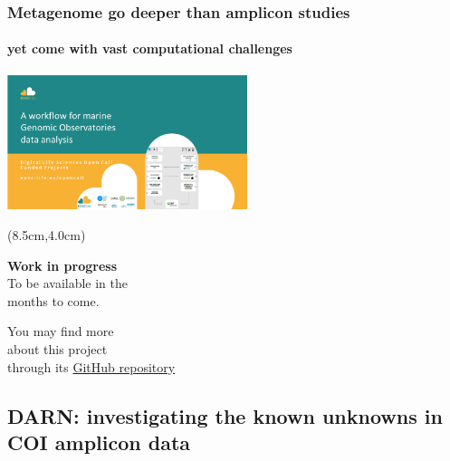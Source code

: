 \documentclass{beamer}
\begin{document}
   \begin{frame}
      \frametitle{Metagenome go deeper than amplicon studies}
      \framesubtitle{yet come with vast computational challenges}
      \includegraphics[width=70mm]{resources/marine-genomic-observatories.png}

      \begin{textblock*}{5cm}(8.5cm,4.0cm) %
            
         \textbf{Work in progress} \\
         To be available in the \\ months to come.

         \bigskip
         
         \footnotesize
         You may find more \\ 
         \footnotesize
         about this project  \\
         \footnotesize
         through its \href{https://github.com/emo-bon/pipeline-v5}{GitHub repository}

      \end{textblock*}
   \end{frame}
   \fi



   \begin{darkframes}
      \subsection{DARN: investigating the known unknowns in COI amplicon data}
   \end{darkframes}
   
\end{document}
